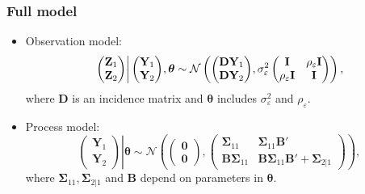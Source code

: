 \documentclass{beamer}
\newcommand{\Bmat} {\textbf{B}}
\newcommand{\Dmat} {\textbf{D}}
\newcommand{\Imat} {\textbf{I}}
\newcommand{\Yvec}{\mathbf{Y}}
\newcommand{\Zvec}{\mathbf{Z}}
\newcommand{\thetab}{\boldsymbol{\theta}}
\newcommand{\bzero}{\boldsymbol{0}}
\newcommand{\bSigma}{\bm{\Sigma}}
\begin{document}

\begin{frame}
\frametitle{Full model}

\begin{itemize}
\item Observation model:
\begin{align*}
\left.\begin{pmatrix} \Zvec_1 \\ \Zvec_2 \end{pmatrix}
\right|
\begin{pmatrix} \Yvec_1 \\ \Yvec_2 \end{pmatrix} \hspace{-0.02in} ,\thetab
\sim
\mathcal{N}\left(
\begin{pmatrix} \Dmat\Yvec_1 \\ \Dmat\Yvec_2 \end{pmatrix}  \hspace{-0.02in}, \sigma^2_\varepsilon\begin{pmatrix} \Imat & \rho_\varepsilon\Imat \\ \rho_\varepsilon\Imat & \Imat \end{pmatrix}
\right),
\end{align*}
where $\Dmat$ is an incidence matrix and $\thetab$ includes $\sigma^2_\varepsilon$ and $\rho_\varepsilon$.
\item Process model:
\begin{equation*}
\left.\begin{pmatrix} \Yvec_1 \\ \Yvec_2 \end{pmatrix}\right| \thetab \sim \mathcal{N} 
\left(
\begin{pmatrix} \bzero \\ \bzero \end{pmatrix}, 
\begin{pmatrix}
\bSigma_{11} & \bSigma_{11}\Bmat' \\
\Bmat \bSigma_{11} & \Bmat \bSigma_{11}\Bmat' + \bSigma_{2|1}
\end{pmatrix}
\right),
\end{equation*}
\noindent where $\bSigma_{11}, \bSigma_{2|1}$ and $\Bmat$ depend on parameters in $\thetab$.
\end{itemize}
\end{frame}

\end{document}
